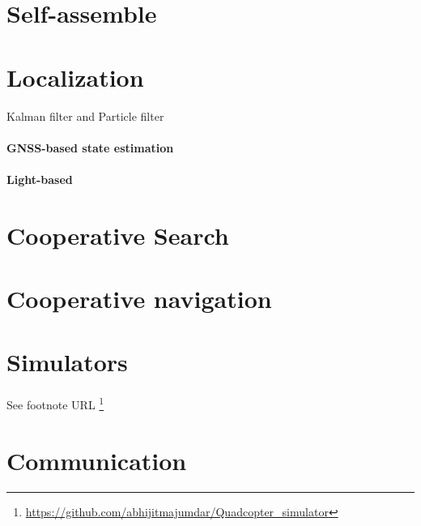 \documentclass{article}
\begin{document}
	\section{Self-assemble}
		\cite{saldana-2018-modquad-the-flying-modular-structure-that-self-assembles-in-midair}
	\section{Localization}
		Kalman filter and Particle filter
		\paragraph{GNSS-based state estimation}
			\cite{spurny-2017-cooperative-autonomous-search-grasping-and-delivering-in-a-treasure-hunt-scenario-by-a-team-of-uavs}
		\paragraph{Light-based}
			\cite{walter-2018-mutual-localization-of-uavs-based-on-blinking-ultraviolet-markers-and-3d-time-position-hough-transform}
	\section{Cooperative Search}
	\cite{spurny-2017-cooperative-autonomous-search-grasping-and-delivering-in-a-treasure-hunt-scenario-by-a-team-of-uavs}
	\section{Cooperative navigation}
	\cite{spurny-2017-cooperative-autonomous-search-grasping-and-delivering-in-a-treasure-hunt-scenario-by-a-team-of-uavs}
	
	\section{Simulators}
		\paragraph{} See footnote URL \footnote{\url{https://github.com/abhijitmajumdar/Quadcopter_simulator}}
	\section{Communication}
	
\end{document}
